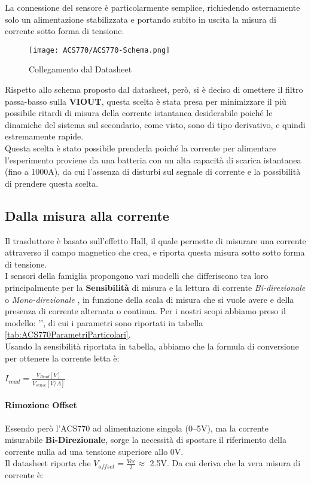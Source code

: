 La connessione del sensore è particolarmente semplice, richiedendo esternamente solo un alimentazione stabilizzata e portando subito in uscita la misura di corrente sotto forma di tensione.
\begin{figure}[H]
	\centering
	\caption[ Schema di collegamento dal Datasheet]{Collegamento dal Datasheet}
	\texttt{[image: ACS770/ACS770-Schema.png]}
\end{figure} \vspace{-8mm}
\noindent
Rispetto allo schema proposto dal datasheet, però, si è deciso di omettere il filtro passa-basso sulla \textbf{VIOUT}, questa scelta è stata presa per minimizzare il più possibile ritardi di misura della corrente istantanea desiderabile poiché le dinamiche del sistema sul secondario, come visto, sono di tipo derivativo, e quindi estremamente rapide.\\
Questa scelta è stato possibile prenderla poiché la corrente per alimentare l'esperimento proviene da una batteria con un alta capacità di scarica istantanea (fino a 1000A), da cui l'assenza di disturbi sul segnale di corrente e la possibilità di prendere questa scelta.

\subsection{Dalla misura alla corrente}
Il trasduttore è basato sull'effetto Hall, il quale permette di misurare una corrente attraverso il campo magnetico che crea, e riporta questa misura sotto sotto forma di tensione.\\
I sensori della famiglia \cite{ACS770} propongono vari modelli che differiscono tra loro principalmente per la \textbf{Sensibilità} di misura e la lettura di corrente \textit{Bi-direzionale} o \textit{Mono-direzionale} , in funzione della scala di misura che si vuole avere e della presenza di corrente alternata o continua.
Per i nostri scopi abbiamo preso il modello: '', di cui i parametri sono riportati in tabella \ref{tab:ACS770ParametriParticolari}.\\
Usando la sensibilità riportata in tabella, abbiamo che la formula di conversione per ottenere la corrente letta è:
 \begin{center}
 	{\large $I_{read} = \frac{V_{Read}[V]}{V_{sense}[V/A]}$ }
\end{center}


\paragraph{Rimozione Offset}
Essendo però l'ACS770 ad alimentazione singola (0--5V), ma la corrente misurabile \textbf{Bi-Direzionale}, sorge la necessità di spostare il riferimento della corrente nulla ad una tensione superiore allo 0V.\\
Il datasheet riporta che $V_{offset} = \frac{Vcc}{2}\approx$ 2.5V. Da cui deriva che la vera misura di corrente è:

